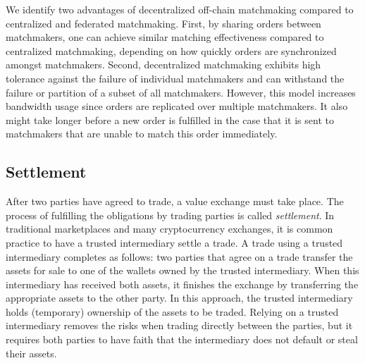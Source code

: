 

We identify two advantages of decentralized off-chain matchmaking compared to centralized and federated matchmaking.
First, by sharing orders between matchmakers, one can achieve similar matching effectiveness compared to centralized matchmaking, depending on how quickly orders are synchronized amongst matchmakers.
Second, decentralized matchmaking exhibits high tolerance against the failure of individual matchmakers and can withstand the failure or partition of a subset of all matchmakers.
However, this model increases bandwidth usage since orders are replicated over multiple matchmakers.
It also might take longer before a new order is fulfilled in the case that it is sent to matchmakers that are unable to match this order immediately.

\subsection{Settlement}
After two parties have agreed to trade, a value exchange must take place.
The process of fulfilling the obligations by trading parties is called \emph{settlement}.
In traditional marketplaces and many cryptocurrency exchanges, it is common practice to have a trusted intermediary settle a trade.
A trade using a trusted intermediary completes as follows: two parties that agree on a trade transfer the assets for sale to one of the wallets owned by the trusted intermediary.
When this intermediary has received both assets, it finishes the exchange by transferring the appropriate assets to the other party.
In this approach, the trusted intermediary holds (temporary) ownership of the assets to be traded.
Relying on a trusted intermediary removes the risks when trading directly between the parties, but it requires both parties to have faith that the intermediary does not default or steal their assets.

